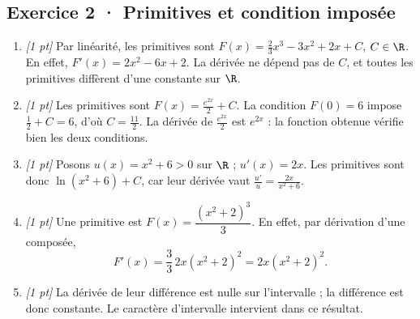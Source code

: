 \subsection*{Exercice 2 · Primitives et condition imposée}\begin{enumerate}

\item \textit{[1 pt]} Par linéarité, les primitives sont $F(x)=\frac{2}{3}x^3-3x^2+2x+C$, $C\in\R$. En effet, $F'(x)=2x^2-6x+2$. La dérivée ne dépend pas de $C$, et toutes les primitives diffèrent d'une constante sur $\R$.

\item \textit{[1 pt]} Les primitives sont $F(x)=\frac{e^{2x}}{2}+C$. La condition $F(0)=6$ impose $\frac{1}{2}+C=6$, d'où $C=\frac{11}{2}$. La dérivée de $\frac{e^{2x}}{2}$ est $e^{2x}$ : la fonction obtenue vérifie bien les deux conditions.

\item \textit{[1 pt]} Posons $u(x)=x^2+6>0$ sur $\R$ ; $u'(x)=2x$. Les primitives sont donc $\ln(x^2+6)+C$, car leur dérivée vaut $\frac{u'}{u}=\frac{2x}{x^2+6}$.

\item \textit{[1 pt]} Une primitive est $F(x)=\dfrac{(x^2+2)^{3}}{3}$. En effet, par dérivation d'une composée,
\[F'(x)=\frac{3}{3}\,2x(x^2+2)^{2}=2x(x^2+2)^{2}.\]

\item \textit{[1 pt]} La dérivée de leur différence est nulle sur l'intervalle ; la différence est donc constante. Le caractère d'intervalle intervient dans ce résultat.

\end{enumerate}

